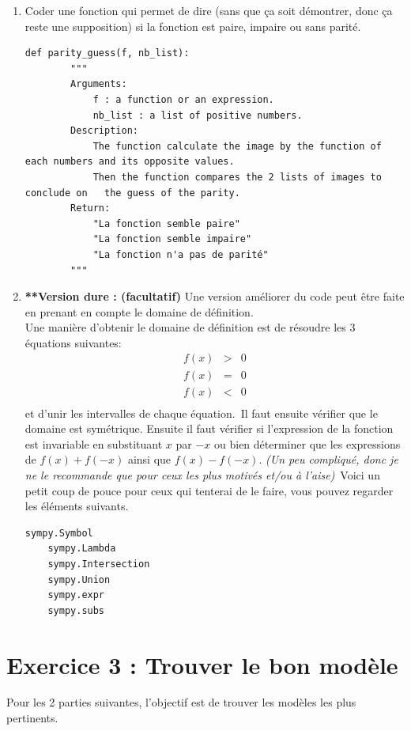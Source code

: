 \documentclass[11pt, french]{article}
\begin{document}
\begin{enumerate}
    \item Coder une fonction qui permet de dire (sans que ça soit démontrer, donc ça reste une supposition) si la fonction est paire, impaire ou sans parité.
    \begin{lstlisting}[style=nightly]
    def parity_guess(f, nb_list):
        """
        Arguments:
            f : a function or an expression.
            nb_list : a list of positive numbers.
        Description:
            The function calculate the image by the function of each numbers and its opposite values.
            Then the function compares the 2 lists of images to conclude on   the guess of the parity.
        Return:
            "La fonction semble paire"
            "La fonction semble impaire"
            "La fonction n'a pas de parité"
        """
    \end{lstlisting}
    \item \textbf{**Version dure : (facultatif)}
    Une version améliorer du code peut être faite en prenant en compte le domaine de définition.\\
    Une manière d'obtenir le domaine de définition est de résoudre les 3 équations suivantes:
    \begin{equation*}
    \begin{matrix}
        f(x) & > & 0 \\
        f(x) & = & 0 \\
        f(x) & < & 0 \\
    \end{matrix}
    \end{equation*}
    et d'unir les intervalles de chaque équation.\
    Il faut ensuite vérifier que le domaine est symétrique.
    Ensuite il faut vérifier si l'expression de la fonction est invariable en substituant $x$ par $-x$ ou bien déterminer que les expressions de $f(x) +f(-x)$ ainsi que $f(x) - f(-x)$.
    \textit{(Un peu compliqué, donc je ne le recommande que pour ceux les plus motivés et/ou à l'aise)}\
    Voici un petit coup de pouce pour ceux qui tenterai de le faire, vous pouvez regarder les éléments suivants.
   \begin{lstlisting}[style=nightly]
    sympy.Symbol
    sympy.Lambda
    sympy.Intersection
    sympy.Union
    sympy.expr
    sympy.subs
   \end{lstlisting}
\end{enumerate}
\vspace{2cm}

\section*{Exercice 3 : Trouver le bon modèle}
Pour les 2 parties suivantes, l'objectif est de trouver les modèles les plus pertinents.
\end{document}
